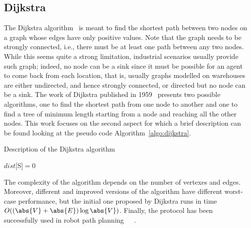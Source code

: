 \subsection{Dijkstra}
The Dijkstra algorithm~\cite{dijkstra} is meant to find the shortest path 
between two nodes on a graph whose edges have only positive values. Note that
the graph needs to be strongly connected, i.e., there must be at least one path
between any two nodes. While this seems quite a strong limitation, industrial
scenarios usually provide such graph; indeed, no node can
be a sink since it must be possible for an agent to come back from each
location, that is, usually graphs modelled on warehouses are either undirected, 
and hence strongly connected, or directed but no node can be a sink. \newline
The work of Dijkstra published in 1959~\cite{dijkstra} presents two possible
algorithms, one to find the shortest path from one node to another and one to
find a tree of minimum length starting from a node and reaching all the other
nodes. This work focuses on the second aspect for which a brief description can
be found looking at the pseudo code Algorithm~\ref{algo:dijkstra}.
\begin{algorithm}
  \DontPrintSemicolon
  \caption{Description of the Dijkstra algorithm}
  \label{algo:dijkstra}

  \;

  \;

  $dist[$S$]=0$\;
  \;
\end{algorithm}\newline
The complexity of the algorithm depends on the number of vertexes and edges.
Moreover, different and improved versions of the algorithm have different
worst-case performance, but the initial one proposed by Dijkstra runs in time
$O((\abs{V}+\abs{E})\log\abs{V})$.\newline
Finally, the protocol has been successfully used in robot path
planning~\cite{dijkstra1}~\cite{dijkstra2}~\cite{dijkstra3}.
%
%

